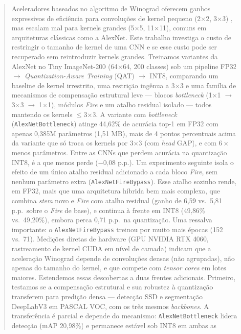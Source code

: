 \documentclass[conference]{IEEEtran}
\begin{document}
\begin{abstract}
Aceleradores baseados no algoritmo de Winograd oferecem ganhos expressivos de eficiência para
convoluções de kernel pequeno (2$\times$2, 3$\times$3) \cite{lavin2016fast}, mas escalam mal para kernels grandes
(5$\times$5, 11$\times$11), comuns em arquiteturas clássicas como a AlexNet. Este trabalho investiga
o custo de restringir o tamanho de kernel de uma CNN e se esse custo pode ser recuperado sem
reintroduzir kernels grandes. Treinamos variantes da AlexNet no Tiny ImageNet-200 (64$\times$64,
200 classes) sob um pipeline FP32 $\rightarrow$ \textit{Quantization-Aware Training} (QAT)
$\rightarrow$ INT8, comparando um baseline de kernel irrestrito, uma restrição ingênua a
3$\times$3 e uma família de mecanismos de compensação estrutural leve — blocos \textit{bottleneck}
(1$\times$1 $\rightarrow$ 3$\times$3 $\rightarrow$ 1$\times$1), módulos \textit{Fire}
\cite{iandola2016squeezenet} e um atalho residual isolado — todos mantendo os kernels
$\leq$3$\times$3. A variante com \textit{bottleneck} (\texttt{AlexNetBottleneck}) atinge 44,62\% de
acurácia top-1 em FP32 com apenas 0,385M parâmetros (1,51 MB), mais de 4 pontos percentuais acima
da variante que só troca os kernels por 3$\times$3 (com \textit{head} GAP), e com $6\times$ menos
parâmetros. Entre as CNNs que perdem acurácia na quantização INT8, é a que menos perde ($-$0,08
p.p.). Um experimento seguinte isola o efeito de um único atalho residual adicionado a cada bloco
\textit{Fire}, sem nenhum parâmetro extra (\texttt{AlexNetFireBypass}). Esse atalho sozinho rende,
em FP32, mais que uma arquitetura híbrida bem mais complexa, que combina \textit{stem} novo e
\textit{Fire} com atalho residual (ganho de 6,59 vs.\ 5,81 p.p.\ sobre o \textit{Fire} de base), e
continua à frente em INT8 (49,86\% vs.\ 49,20\%), embora perca 0,71 p.p.\ na quantização. Uma
ressalva importante: o \texttt{AlexNetFireBypass} treinou por muito mais épocas (152 vs.\ 71).
Medições diretas de hardware (GPU
NVIDIA RTX 4060, rastreamento de kernel CUDA em nível de camada) indicam que a aceleração
Winograd depende de convoluções densas (não agrupadas), não apenas do tamanho do kernel, e que
compete com \textit{tensor cores} em lotes maiores. Estendemos essas descobertas a duas frentes
adicionais. Primeiro, testamos se a compensação estrutural e sua robustez à quantização
transferem para predição densa — detecção SSD e segmentação DeepLabV3 em PASCAL VOC, com os três
mesmos \textit{backbones}. A transferência é parcial e depende do mecanismo:
\texttt{AlexNetBottleneck} lidera detecção (mAP 20,98\%) e permanece estável sob INT8 em ambas as

\end{abstract}
\end{document}
